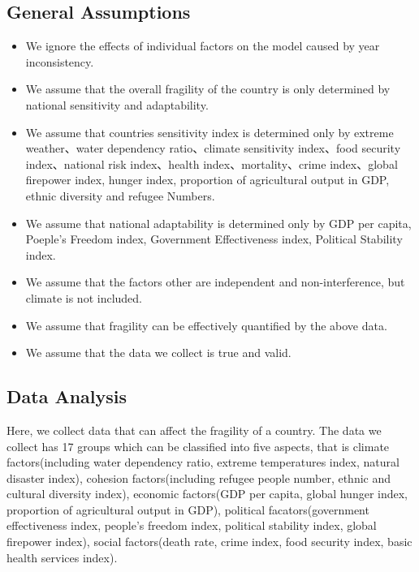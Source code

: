 \documentclass{mcmthesis}
\begin{document}
\subsection{General Assumptions}
\begin{itemize}
  \item We ignore the effects of individual factors on the model caused by year inconsistency.
  \item We assume that the overall fragility of the country is only determined by national sensitivity and adaptability.
  \item We assume that countries sensitivity index is determined only by extreme weather、water dependency ratio、climate sensitivity index、food security index、national risk index、health index、mortality、crime index、global firepower index, hunger index,  proportion of agricultural output in GDP, ethnic diversity and refugee Numbers.
  \item We assume that national adaptability is determined only by GDP per capita, Poeple's Freedom index, Government Effectiveness index, Political Stability index.
  \item We assume that the factors other are independent and non-interference, but climate is not included.
  \item We assume that fragility can be effectively quantified by the above data.
  \item We assume that the data we collect is true and valid.
\end{itemize}
\subsection{Data Analysis}
Here, we collect data that can affect the fragility of a country. The data we collect has 
17 groups which can be classified into five aspects, that is climate factors(including water 
dependency ratio, extreme temperatures index, natural disaster index), cohesion factors(including 
refugee people number, ethnic and cultural diversity index), economic factors(GDP per capita, global 
hunger index, proportion of agricultural output in GDP), political facators(government effectiveness 
index, people's freedom index, political stability index, global firepower index), social factors(death 
rate, crime index, food security index, basic health services index).
\end{document}
